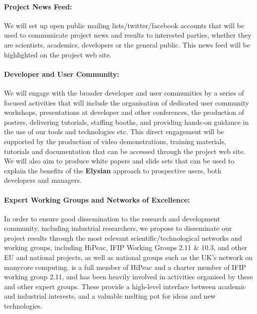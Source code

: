 \documentclass[a4paper,11pt]{article}
\newcommand{\project}[1]{\textbf{#1}\xspace}
\newcommand{\SECURITY}{\project{Elysian}}
\newcommand{\TheProject}{\SECURITY}
\begin{document}
\paragraph{Project News Feed:}  We will set up open public mailing lists/twitter/facebook accounts that will
be used to communicate project news and results to interested parties, whether they are scientists, academics, developers
or the general public.  This news feed will be highlighted on the project web site.

\paragraph{Developer and User Community:} We will engage with the broader
developer and user communities by a series of focused activities
that will include the organisation of dedicated user community workshops, presentations at
 developer and other conferences, 
 the production of posters, delivering tutorials, staffing booths, and providing hands-on
 guidance in the use of our tools and technologies etc.  This direct engagement will be
 supported by the production of video demonstrations, training materials, tutorials and documentation that can
 be accessed through the project web site.  We will also aim to produce white papers and slide sets that
 can be used to explain the benefits of the \TheProject{} approach to prospective users, both developers
 and managers.

 \paragraph{Expert Working Groups and Networks of Excellence:}
In order to ensure good dissemination to the research and development
community, including industrial researchers, we propose to disseminate
our project results through the most relevant scientific/technological
networks and working groups, including HiPeac,%
IFIP Working Groups 2.11 \& 10.3, and other EU and national projects,
as well as national groups such as the UK's network on manycore computing.
\SAshort{} is a full member of HiPeac and a charter member of IFIP working
group 2.11, and has been heavily involved in activities organised by these and other expert groups.
These provide a high-level interface between academic and industrial interests, and a valuable
melting pot for ideas and new technologies. 
\end{document}
